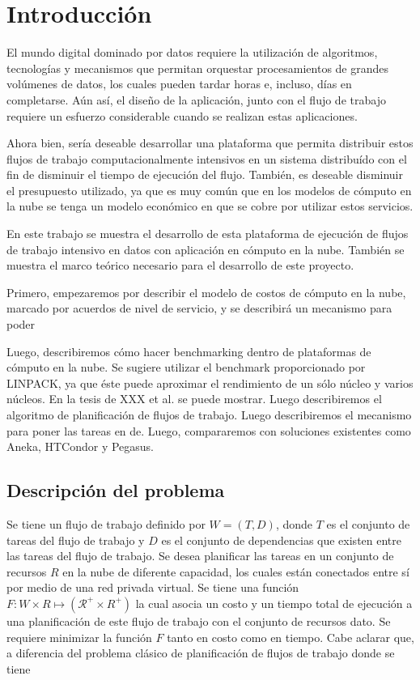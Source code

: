 \chapter{Introducción}

El mundo digital dominado por datos requiere la utilización de algoritmos, tecnologías y mecanismos que permitan orquestar procesamientos de grandes volúmenes de datos, los cuales pueden tardar horas e, incluso, días en completarse. Aún así, el diseño de la aplicación, junto con el flujo de trabajo requiere un esfuerzo considerable cuando se realizan estas aplicaciones.

Ahora bien, sería deseable desarrollar una plataforma que permita distribuir estos flujos de trabajo computacionalmente intensivos en un sistema distribuído con el fin de disminuir el tiempo de ejecución del flujo. También, es deseable disminuir el presupuesto utilizado, ya que es muy común que en los modelos de cómputo en la nube se tenga un modelo económico en que se cobre por utilizar estos servicios.

En este trabajo se muestra el desarrollo de esta plataforma de ejecución de flujos de trabajo intensivo en datos con aplicación en cómputo en la nube. También se muestra el marco teórico necesario para el desarrollo de este proyecto.

Primero, empezaremos por describir el modelo de costos de cómputo en la nube, marcado por acuerdos de nivel de servicio, y se describirá un mecanismo para poder

Luego, describiremos cómo hacer benchmarking dentro de plataformas de cómputo en la nube. Se sugiere utilizar el benchmark proporcionado por LINPACK, ya que éste puede aproximar el rendimiento de un sólo núcleo y varios núcleos. En la tesis de XXX et al. se puede mostrar. Luego describiremos el algoritmo de planificación de flujos de trabajo. Luego describiremos el mecanismo para poner las tareas en de. Luego, compararemos con soluciones existentes como Aneka, HTCondor y Pegasus.


\section{Descripción del problema}

Se tiene un flujo de trabajo definido por $W = (T, D)$, donde $T$ es el conjunto de tareas del flujo de trabajo y $D$ es el conjunto de dependencias que existen entre las tareas del flujo de trabajo. Se desea planificar las tareas en un conjunto de recursos $R$ en la nube de diferente capacidad, los cuales están conectados entre sí por medio de una red privada virtual. Se tiene una función $F: W \times R \mapsto (\mathcal{R}^{+} \times {R}^{+}) $ la cual asocia un costo y un tiempo total de ejecución a una planificación de este flujo de trabajo con el conjunto de recursos dato. Se requiere minimizar la función $F$ tanto en costo como en tiempo. Cabe aclarar que, a diferencia del problema clásico de planificación de flujos de trabajo donde se tiene
